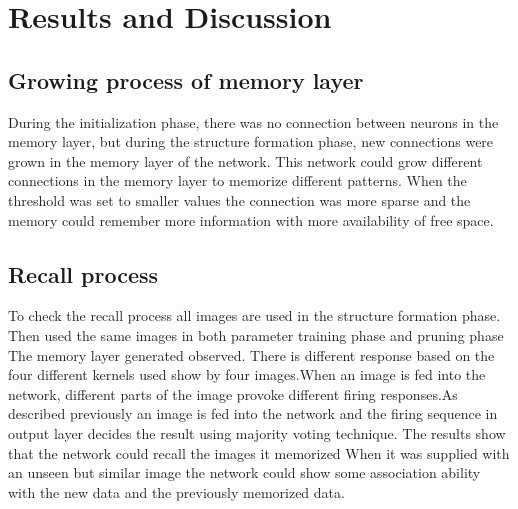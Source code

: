 \chapter{Results and Discussion}

\section{Growing process of memory layer}
During the initialization phase, there was no connection between neurons in the
memory layer, but during the structure formation phase, new connections were
grown in the memory layer of the network. This network could grow different
connections in the memory layer to memorize different patterns. When the
threshold was set to smaller values the connection was more sparse and the
memory could remember more information with more availability of free space.
\section{Recall process}
To check the recall process all images are used in the structure formation
phase. Then used the same images in both parameter training phase and pruning
phase The memory layer generated observed. There is different response based on
the four different kernels used show by four images.When an image is fed into
the network, different parts of the image provoke different firing responses.As
described previously an image is fed into the network and the firing sequence
in output layer decides the result using majority voting technique. The results
show that the network could recall the images it memorized When it was supplied
with an unseen but similar image the network could show some association
ability with the new data and the previously memorized data.